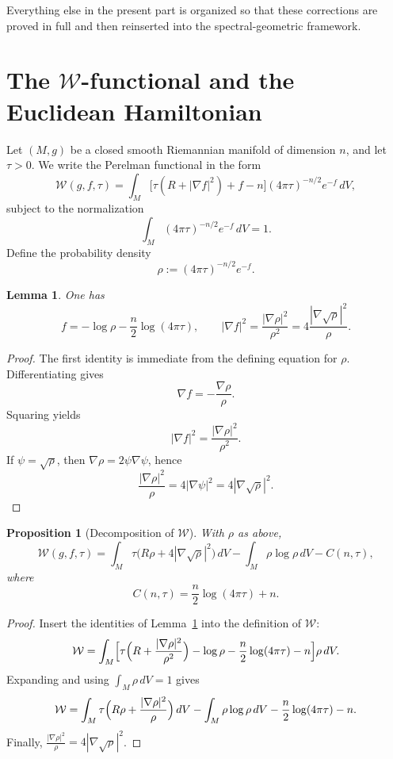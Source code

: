 \documentclass[11pt,a4paper]{article}
\numberwithin{equation}{section}
\newtheorem{proposition}[theorem]{Proposition}
\newtheorem{lemma}[theorem]{Lemma}
\theoremstyle{definition}
\theoremstyle{remark}
\begin{document}
Everything else in the present part is organized so that these corrections are proved in full and then reinserted into the spectral-geometric framework.

\section{The $\mathcal W$-functional and the Euclidean Hamiltonian}

Let $(M,g)$ be a closed smooth Riemannian manifold of dimension $n$, and let $\tau>0$.  We write the Perelman functional in the form
\[
\mathcal W(g,f,\tau)=\int_M \bigl[\tau(R+|\nabla f|^2)+f-n\bigr](4\pi\tau)^{-n/2}e^{-f}\,dV,
\]
subject to the normalization
\[
\int_M (4\pi\tau)^{-n/2}e^{-f}\,dV=1.
\]
Define the probability density
\[
\rho:=(4\pi\tau)^{-n/2}e^{-f}.
\]

\begin{lemma}\label{mod:rho-identities}
One has
\[
f=-\log\rho-\frac n2\log(4\pi\tau),
\qquad
|\nabla f|^2=\frac{|\nabla\rho|^2}{\rho^2}
=4\frac{|\nabla\sqrt\rho|^2}{\rho}.
\]
\end{lemma}

\begin{proof}
The first identity is immediate from the defining equation for $\rho$.  Differentiating gives
\[
\nabla f=-\frac{\nabla\rho}{\rho}.
\]
Squaring yields
\[
|\nabla f|^2=\frac{|\nabla\rho|^2}{\rho^2}.
\]
If $\psi=\sqrt\rho$, then $\nabla\rho=2\psi\nabla\psi$, hence
\[
\frac{|\nabla\rho|^2}{\rho}=4|\nabla\psi|^2=4|\nabla\sqrt\rho|^2.
\]
\end{proof}

\begin{proposition}[Decomposition of $\mathcal W$]\label{mod:W-decomp}
With $\rho$ as above,
\[
\mathcal W(g,f,\tau)
=
\int_M \tau\bigl(R\rho+4|\nabla\sqrt\rho|^2\bigr)\,dV
-\int_M \rho\log\rho\,dV
-C(n,\tau),
\]
where
\[
C(n,\tau)=\frac n2\log(4\pi\tau)+n.
\]
\end{proposition}

\begin{proof}
Insert the identities of Lemma~\ref{mod:rho-identities} into the definition of $\mathcal W$:
\[
\mathcal W
=
\int_M \Bigl[\tau\Bigl(R+\frac{|\nabla\rho|^2}{\rho^2}\Bigr)-\log\rho-\frac n2\log(4\pi\tau)-n\Bigr]\rho\,dV.
\]
Expanding and using $\int_M\rho\,dV=1$ gives
\[
\mathcal W
=
\int_M \tau\Bigl(R\rho+\frac{|\nabla\rho|^2}{\rho}\Bigr)\,dV
-\int_M \rho\log\rho\,dV
-\frac n2\log(4\pi\tau)-n.
\]
Finally, $\frac{|\nabla\rho|^2}{\rho}=4|\nabla\sqrt\rho|^2$.
\end{proof}
\end{document}
